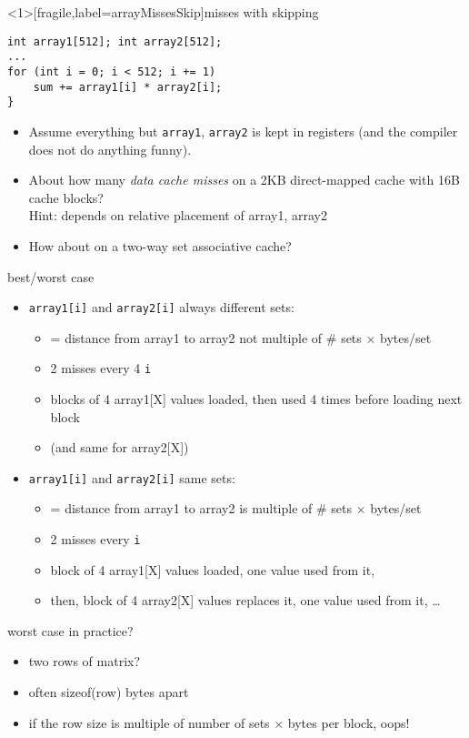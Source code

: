 \begin{frame}<1>[fragile,label=arrayMissesSkip]{misses with skipping}
\begin{lstlisting}
int array1[512]; int array2[512];
...
for (int i = 0; i < 512; i += 1)
    sum += array1[i] * array2[i];
}
\end{lstlisting}
    \begin{itemize}
        \item {\small
    Assume everything but {\tt array1}, {\tt array2} is kept in registers (and the compiler does not do
    anything funny).
        }
    \item
About how many \textit{data cache misses} on a 2KB direct-mapped cache with 16B cache blocks? \\
Hint: depends on relative placement of array1, array2
\item<2->How about on a two-way set associative cache?
\end{itemize}
\end{frame}

\begin{frame}{best/worst case}
\begin{itemize}
\item \texttt{array1[i]} and \texttt{array2[i]} always different sets:
    \begin{itemize}
    \item = distance from array1 to array2 not multiple of \# sets $\times$ bytes/set
    \item 2 misses every 4 \texttt{i}
    \item blocks of 4 array1[X] values loaded, then used 4 times before loading next block
    \item (and same for array2[X])
    \end{itemize}
\item \texttt{array1[i]} and \texttt{array2[i]} same sets:
    \begin{itemize}
    \item = distance from array1 to array2 is multiple of \# sets $\times$ bytes/set
    \item 2 misses every \texttt{i}
    \item block of 4 array1[X] values loaded, one value used from it,
    \item then, block of 4 array2[X] values replaces it, one value used from it, \ldots
    \end{itemize}
\end{itemize}
\end{frame}

\begin{frame}{worst case in practice?}
    \begin{itemize}
    \item two rows of matrix?
    \item often sizeof(row) bytes apart
    \item if the row size is multiple of number of sets $\times$ bytes per block, oops!
    \end{itemize}
\end{frame}
